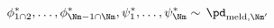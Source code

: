 \begin{equation}
  \phi_{1 \cap 2}^{*}, \ldots, \phi_{\Nm - 1 \cap \Nm}^{*}, \psi_{1}^{*}, \ldots, \psi_{\Nm}^{*} 
    \sim \, 
    \pd_{\text{meld}, \Nm'}
  \label{eqn:stage-Mplus1-update}
\end{equation}